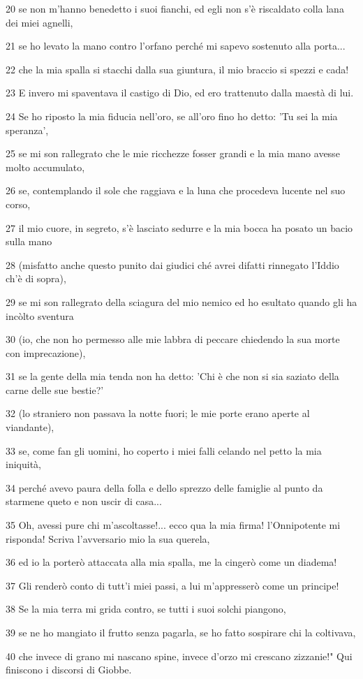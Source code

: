 \par 20 se non m'hanno benedetto i suoi fianchi, ed egli non s'è riscaldato colla lana dei miei agnelli,
\par 21 se ho levato la mano contro l'orfano perché mi sapevo sostenuto alla porta...
\par 22 che la mia spalla si stacchi dalla sua giuntura, il mio braccio si spezzi e cada!
\par 23 E invero mi spaventava il castigo di Dio, ed ero trattenuto dalla maestà di lui.
\par 24 Se ho riposto la mia fiducia nell'oro, se all'oro fino ho detto: 'Tu sei la mia speranza',
\par 25 se mi son rallegrato che le mie ricchezze fosser grandi e la mia mano avesse molto accumulato,
\par 26 se, contemplando il sole che raggiava e la luna che procedeva lucente nel suo corso,
\par 27 il mio cuore, in segreto, s'è lasciato sedurre e la mia bocca ha posato un bacio sulla mano
\par 28 (misfatto anche questo punito dai giudici ché avrei difatti rinnegato l'Iddio ch'è di sopra),
\par 29 se mi son rallegrato della sciagura del mio nemico ed ho esultato quando gli ha incòlto sventura
\par 30 (io, che non ho permesso alle mie labbra di peccare chiedendo la sua morte con imprecazione),
\par 31 se la gente della mia tenda non ha detto: 'Chi è che non si sia saziato della carne delle sue bestie?'
\par 32 (lo straniero non passava la notte fuori; le mie porte erano aperte al viandante),
\par 33 se, come fan gli uomini, ho coperto i miei falli celando nel petto la mia iniquità,
\par 34 perché avevo paura della folla e dello sprezzo delle famiglie al punto da starmene queto e non uscir di casa...
\par 35 Oh, avessi pure chi m'ascoltasse!... ecco qua la mia firma! l'Onnipotente mi risponda! Scriva l'avversario mio la sua querela,
\par 36 ed io la porterò attaccata alla mia spalla, me la cingerò come un diadema!
\par 37 Gli renderò conto di tutt'i miei passi, a lui m'appresserò come un principe!
\par 38 Se la mia terra mi grida contro, se tutti i suoi solchi piangono,
\par 39 se ne ho mangiato il frutto senza pagarla, se ho fatto sospirare chi la coltivava,
\par 40 che invece di grano mi nascano spine, invece d'orzo mi crescano zizzanie!" Qui finiscono i discorsi di Giobbe.

